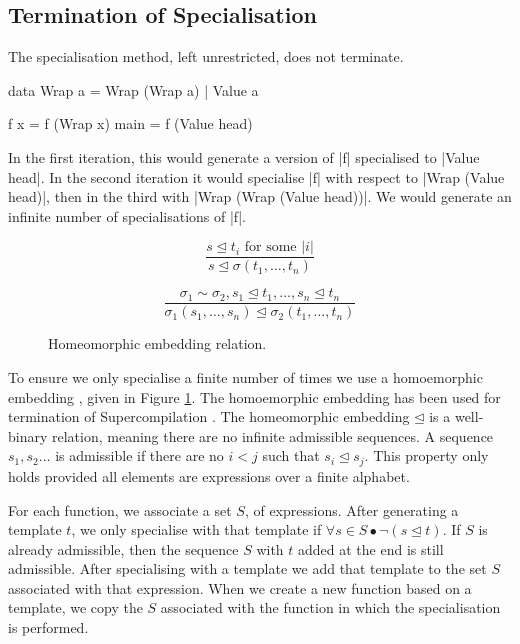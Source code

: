\documentclass[preprint]{sigplanconf}
\begin{document}
\subsection{Termination of Specialisation}

The specialisation method, left unrestricted, does not terminate.

\begin{example}
\begin{code}
data Wrap a  =  Wrap (Wrap a)
             |  Value a

f x = f (Wrap x)
main = f (Value head)
\end{code}

In the first iteration, this would generate a version of |f| specialised to |Value head|. In the second iteration it would specialise |f| with respect to |Wrap (Value head)|, then in the third with |Wrap (Wrap (Value head))|. We would generate an infinite number of specialisations of |f|.
\end{example}

\begin{figure}
\[\frac{s \unlhd t_i \text{ for some } |i|}{s \unlhd \sigma(t_1,\ldots,t_n)} \]

\[\frac{\sigma_1 \sim \sigma_2,
        s_1 \unlhd t_1, \ldots , s_n \unlhd t_n}
       {\sigma_1 (s_1,\ldots,s_n) \unlhd \sigma_2 (t_1,\ldots,t_n)} \]
\caption{Homeomorphic embedding relation.}
\label{fig:homeomorphic}
\end{figure}

To ensure we only specialise a finite number of times we use a homoemorphic embedding \cite{homeomorphic}, given in Figure \ref{fig:homeomorphic}. The homoemorphic embedding has been used for termination of Supercompilation \cite{sorensen:supercompilation}. The homeomorphic embedding $\unlhd$ is a well-binary relation, meaning there are no infinite admissible sequences. A sequence $s_1,s_2 \ldots$ is admissible if there are no $i < j$ such that $s_i \unlhd s_j$. This property only holds provided all elements are expressions over a finite alphabet.

For each function, we associate a set $S$, of expressions. After generating a template $t$, we only specialise with that template if $\forall s \in S \bullet \neg(s \unlhd t)$. If $S$ is already admissible, then the sequence $S$ with $t$ added at the end is still admissible. After specialising with a template we add that template to the set $S$ associated with that expression. When we create a new function based on a template, we copy the $S$ associated with the function in which the specialisation is performed.
\end{document}
